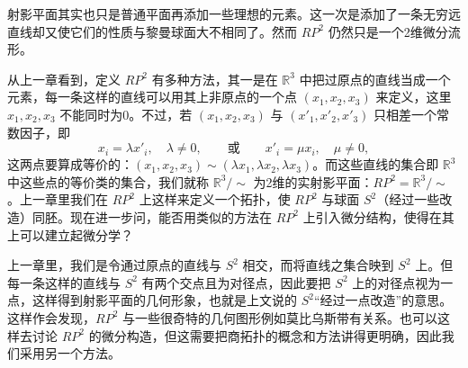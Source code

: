 射影平面其实也只是普通平面再添加一些理想的元素。这一次是添加了一条无穷远直线却又使它们的性质与黎曼球面大不相同了。然而 $RP^2$ 仍然只是一个2维微分流形。

从上一章看到，定义 $RP^2$ 有多种方法，其一是在 $\mathbb R^3$ 中把过原点的直线当成一个元素，每一条这样的直线可以用其上非原点的一个点 $(x_1,x_2,x_3)$ 来定义，这里 $x_1,x_2,x_3$ 不能同时为0。不过，若 $(x_1,x_2,x_3)$ 与 $(x'_1,x'_2,x'_3)$ 只相差一个常数因子，即
\[
 x_i=\lambda x'_i,\quad \lambda\ne0,
 \qquad\text{或}\qquad
 x'_i=\mu x_i,\quad \mu\ne0,
\]
这两点要算成等价的：$(x_1,x_2,x_3)\sim(\lambda x_1,\lambda x_2,\lambda x_3)$。而这些直线的集合即 $\mathbb R^3$ 中这些点的等价类的集合，我们就称 $\mathbb R^3/\sim$ 为2维的实射影平面：$RP^2=\mathbb R^3/\sim$。上一章里我们在 $RP^2$ 上这样来定义一个拓扑，使 $RP^2$ 与球面 $S^2$（经过一些改造）同胚。现在进一步问，能否用类似的方法在 $RP^2$ 上引入微分结构，使得在其上可以建立起微分学？

上一章里，我们是令通过原点的直线与 $S^2$ 相交，而将直线之集合映到 $S^2$ 上。但每一条这样的直线与 $S^2$ 有两个交点且为对径点，因此要把 $S^2$ 上的对径点视为一点，这样得到射影平面的几何形象，也就是上文说的 $S^2$“经过一点改造”的意思。这样作会发现，$RP^2$ 与一些很奇特的几何图形例如莫比乌斯带有关系。也可以这样去讨论 $RP^2$ 的微分构造，但这需要把商拓扑的概念和方法讲得更明确，因此我们采用另一个方法。

